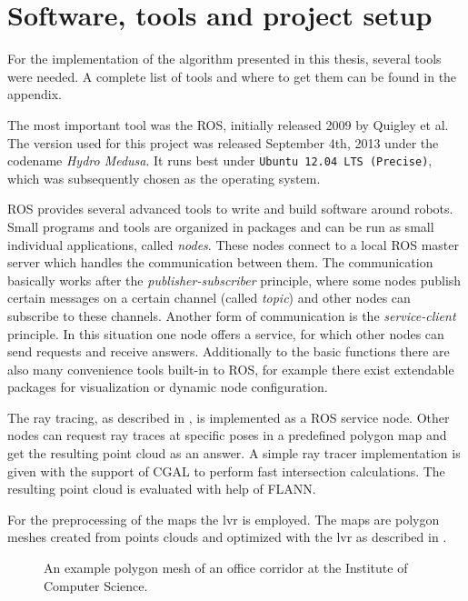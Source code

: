 \documentclass[Thesis.tex]{subfiles}
\begin{document}
\chapter{Software, tools and project setup}
For the implementation of the algorithm presented in this thesis, several tools were needed. A complete list of tools and where to get them can be found in the appendix.

\smallskip

The most important tool was the \gls{ROS}, initially released 2009 by Quigley et al.\cite{ros:2009} The version used for this project was released September 4th, 2013 under the codename \emph{Hydro Medusa}. It runs best under \texttt{Ubuntu 12.04 LTS (Precise)}, which was subsequently chosen as the operating system. 

\gls{ROS} provides several advanced tools to write and build software around robots. Small programs and tools are organized in packages and can be run as small individual applications, called \emph{nodes}. These nodes connect to a local \gls{ROS} master server which handles the communication between them. The communication basically works after the \emph{publisher-subscriber} principle, where some nodes publish certain messages on a certain channel (called \emph{topic}) and other nodes can subscribe to these channels.
Another form of communication is the \emph{service-client} principle. In this situation one node offers a service, for which other nodes can send requests and receive answers. Additionally to the basic functions there are also many convenience tools built-in to \gls{ROS}, for example there exist extendable packages for visualization or dynamic node configuration.

\smallskip

The ray tracing, as described in , is implemented as a \gls{ROS} service node. Other nodes can request ray traces at specific poses in a predefined polygon map and get the resulting point cloud as an answer. A simple ray tracer implementation is given with the support of \gls{CGAL} to perform fast intersection calculations. The resulting point cloud is evaluated with help of \gls{FLANN}. 

For the preprocessing of the maps the \gls{lvr} is employed. The maps are polygon meshes created from points clouds and optimized with the \gls{lvr} as described in \cite{Wiemann:2013}.

\begin{figure}%
\caption[Example polygon mesh]{An example polygon mesh of an office corridor at the Institute of Computer Science.}%
\label{fig:examplemap}%
\end{figure}
\end{document}
